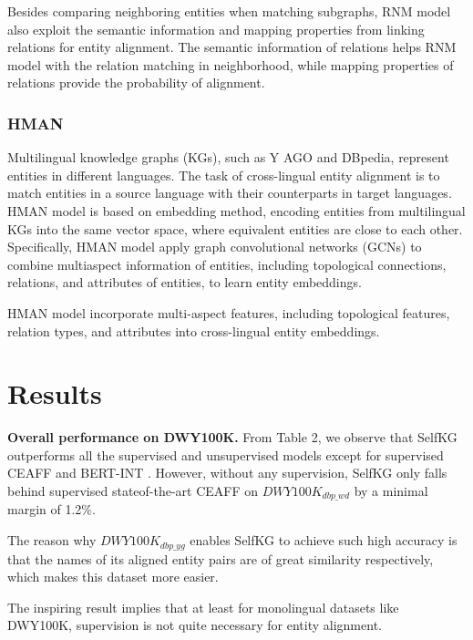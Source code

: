 \documentclass[sigconf]{acmart}
\begin{document}
{Besides comparing neighboring entities when matching subgraphs, RNM model also exploit the semantic information and mapping properties from linking relations for entity alignment. The semantic information of relations helps RNM model with the relation matching in neighborhood, while mapping properties of relations provide the probability of alignment. 

\subsubsection{HMAN \cite{yang2019aligning}}

Multilingual knowledge graphs (KGs), such as Y AGO and DBpedia, represent entities in different languages. The task of cross-lingual entity alignment is to match entities in a source language with their counterparts in target languages. HMAN model is based on embedding method, encoding entities from multilingual KGs into the same vector space, where equivalent entities are close to each other. Specifically, HMAN model apply graph convolutional networks (GCNs) to combine multiaspect information of entities, including topological connections, relations, and attributes of entities, to learn entity embeddings.

HMAN model incorporate multi-aspect features, including topological features, relation types, and attributes into cross-lingual entity embeddings. 

\section{Results}

{\bfseries Overall performance on DWY100K.} From Table 2, we observe that SelfKG outperforms all the supervised and unsupervised models except for supervised CEAFF \cite{zeng2020collective} and BERT-INT \cite{tang2020bert}. However, without any supervision, SelfKG only falls behind supervised stateof-the-art CEAFF on $DWY100K_{dbp\_wd}$ by a minimal margin of 1.2$\%$.

The reason why $DWY100K_{dbp\_yg}$ enables SelfKG to achieve such high accuracy is that the names of its aligned entity pairs are of great similarity respectively, which makes this dataset more easier.

The inspiring result implies that at least for monolingual datasets like DWY100K, supervision is not quite necessary for entity alignment.

}
\end{document}

